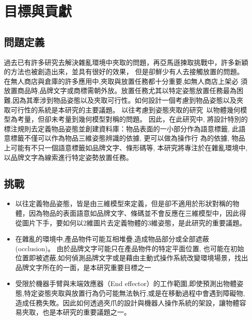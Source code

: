 \section{目標與貢獻}

\subsection{問題定義}
過去已有許多研究去解決雜亂環境中夾取的問題，再亞馬遜揀取挑戰中，許多新穎的方法也被創造出來，並具有很好的效果，
但是卻鮮少有人去接觸放置的問題。在無人商店與倉庫的許多應用中,夾取與放置任務都十分重要,如無人商店上架必
須放置商品時,品牌文字或商標需朝外放。放置任務尤其以特定姿態放置任務最為困
難,因為其牽涉到物品姿態以及夾取可行性。如何設計一個考慮到物品姿態以及夾取可行性的系統是本研究的主要議題。
以往考慮到姿態夾取的研究~\cite{zeng2016multi}以物體幾何模型為考量，但卻未考量到幾何模型對稱的問題。
因此，在此研究中, 將設計特別的標注規則去定義物品姿態並創建資料庫：物品表面的一小部分作為語意標籤, 此語意標籤不僅可以作為物品三維姿態辨識的依據, 更可以做為操作行
為的依據, 物品上可能有不只一個語意標籤如品牌文字、條形碼等, 本研究將專注於在雜亂環境中,以品牌文字為線索進行特定姿勢放置任務。

\subsection{挑戰}
\begin{itemize}
\item 以往定義物品姿態，皆是由三維模型來定義，但是卻不適用於形狀對稱的物體，因為物品的表面語意如品牌文字、條碼並不會反應在三維模型中，因此得從圖片下手，要如何以2維圖片去定義物體的3維姿態，是此研究的重要議題。
\item 在雜亂的環境中,產品物件可能互相堆疊,造成物品部分或全部遮蔽 (occlusion)。
由於品牌文字可能只在產品物件的特定平面位置, 也可能在初始位置即被遮蔽,如何偵測品牌文字或是藉由主動式操作系統改變環境場景，找出品牌文字所在的一面，是本研究重要目標之一
\item 受限於機器手臂與末端效應器（End effector）的工作範圍,即使預測出物體姿態,特定姿態夾取與放置行為仍可能無法執行,或是在移動過程中會遇到障礙物,造成任務失敗。因此如何透過夾爪的設計與機器人操作系統的架設，讓物體容易夾取，也是本研究的重要議題之一。
\end{itemize}


